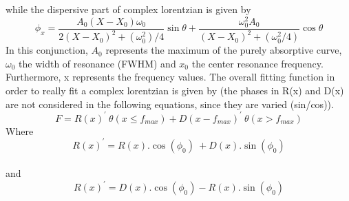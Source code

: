 while the dispersive part of complex lorentzian is given by 
\begin{equation}
\phi_x= \frac{A_0 (X-X_0 )\omega_0}{2(X-X_0 )^2+(\omega_0^2)/4}\sin\theta+\frac{\omega_0^2A_0}{(X-X_0 )^2+(\omega_0^2/4)}\cos\theta
\end{equation}
In this conjunction, $A_0$ represents the maximum of the purely absorptive curve, $\omega_0$ the width
of resonance (FWHM) and $x_0$ the center resonance frequency. Furthermore, x represents
the frequency values.
The overall fitting function in order to really fit a complex lorentzian is given by (the
phases in R(x) and D(x) are not considered in the following equations, since they are varied
(sin/cos)).\\


\begin{equation}
F = R(x)^{'}~\theta(x \leq f_{max}) + D(x-f_{max})^{'}~\theta(x > f_{max})
\label{equation:fit funtion}
\end{equation}
Where 
\begin{equation}
R(x)^{'}=R(x) . \cos(\phi_0)~ + D(x) .\sin(\phi_0)
\end{equation}\\
and
\begin{equation}
R(x)^{'}=D(x) . \cos(\phi_0) - R(x) .\sin(\phi_0)
\end{equation}

